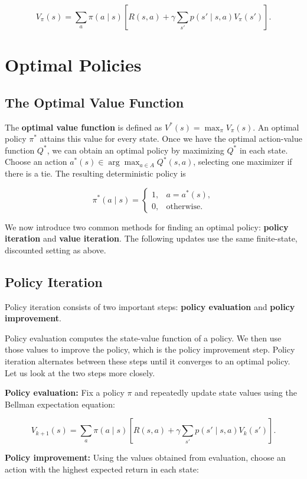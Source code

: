 \documentclass[a4paper,10pt]{article}
\begin{document}
\[
V_\pi(s)=\sum_a\pi(a\mid s)\left[R(s,a)+\gamma\sum_{s'}p(s'\mid s,a)V_\pi(s')\right].
\]

\section{Optimal Policies}

\subsection{The Optimal Value Function}

The \textbf{optimal value function} is defined as \(V^*(s)=\max_\pi V_\pi(s)\). An optimal policy \(\pi^*\) attains this value for every state. Once we have the optimal action-value function \(Q^*\), we can obtain an optimal policy by maximizing \(Q^*\) in each state. Choose an action \(a^*(s)\in\arg\max_{a\in A}Q^*(s,a)\), selecting one maximizer if there is a tie. The resulting deterministic policy is

\[
\pi^*(a\mid s)=
\begin{cases}
1, & a=a^*(s), \\
0, & \text{otherwise}.
\end{cases}
\]

We now introduce two common methods for finding an optimal policy: \textbf{policy iteration} and \textbf{value iteration}. The following updates use the same finite-state, discounted setting as above.

\subsection{Policy Iteration}

Policy iteration consists of two important steps: \textbf{policy evaluation} and \textbf{policy improvement}.

Policy evaluation computes the state-value function of a policy. We then use those values to improve the policy, which is the policy improvement step. Policy iteration alternates between these steps until it converges to an optimal policy. Let us look at the two steps more closely.

\textbf{Policy evaluation:} Fix a policy \(\pi\) and repeatedly update state values using the Bellman expectation equation:

\[
V_{k+1}(s)=\sum_a\pi(a\mid s)
\left[R(s,a)+\gamma\sum_{s'}p(s'\mid s,a)V_k(s')\right].
\]

\textbf{Policy improvement:} Using the values obtained from evaluation, choose an action with the highest expected return in each state:
\end{document}
